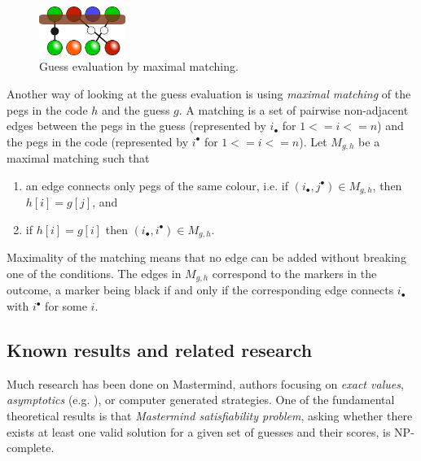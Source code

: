 \begin{figure}
  \vspace{-5mm}
  \begin{center}
  \includegraphics[width=0.25\textwidth]{pictures/mastermind-matching.png}
  \end{center}
  \caption{Guess evaluation by maximal matching.}
  \vspace{-5mm}
\end{figure}

\newcommand{\incode}[1]{#1^\bullet}
\newcommand{\inguess}[1]{#1_\bullet}

Another way of looking at the guess evaluation is using
  \emph{maximal matching} of the pegs in the code $h$ and the guess $g$.
A matching is a set of pairwise non-adjacent edges between
  the pegs in the guess (represented by $\inguess{i}$ for $1<=i<=n$) and
  the pegs in the code (represented by $\incode{i}$ for $1<=i<=n$).
Let $M_{g, h}$ be a maximal matching such that

\begin{enumerate}
\item an edge connects only pegs of the same colour, i.e. if $(\inguess{i},\incode{j})\in M_{g, h}$, then $h[i] = g[j]$, and
\item if $h[i] = g[i]$ then $(\inguess{i},\incode{i})\in M_{g, h}$.
\end{enumerate}

Maximality of the matching means that no edge can be added without breaking one of the conditions.
The edges in $M_{g, h}$ correspond to the markers in the outcome,
  a marker being black if and only if the corresponding edge connects $\inguess{i}$
  with $\incode{i}$ for some $i$.

\subsection{Known results and related research}

Much research has been done on Mastermind, authors focusing
  on \emph{exact values}, \emph{asymptotics} (e.g. \cite{mm-chvatal}), or
  computer generated strategies.
One of the fundamental theoretical results is that
  \emph{Mastermind satisfiability problem}, asking
  whether there exists at least one valid solution for a
  given set of guesses and their scores, is NP-complete\cite{mm-np}.

